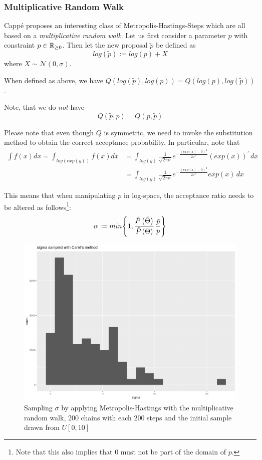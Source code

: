 \subsubsection{Multiplicative Random Walk}
Cappé \cite{cappe} proposes an interesting class of Metropolis-Hastings-Steps which are all based on a \textit{multiplicative random walk}. Let us first consider a parameter $p$ with constraint $p \in \mathbb{R}_{\geq 0}$. Then let the new proposal $\tilde{p}$ be defined as 
\[
	log\left(\tilde{p}\right) := log(p) + X
\]
where $X \sim \mathcal{N}(0, \sigma)$.

\begin{lemma}
	When defined as above, we have $Q\left(log(\tilde{p}), log(p)\right) = Q\left( log(p), log(\tilde{p})\right)$.
	
	Note, that we do \textit{not} have
	\[
	Q\left(\tilde{p}, p\right) = Q\left( p , \tilde{p}\right)
	\]
\end{lemma}

	 Please note that even though $Q$ is symmetric, we need to invoke the substitution method to obtain the correct acceptance probability. 
	 In particular, note that 
	 \begin{align*}
	 	\int f(x) dx = \int_{log(exp(y))} f(x) dx &= 
	 	\int_{log(y)} \frac{1}{\sqrt{2 \pi \sigma}} e^{- \frac{ \left(exp(x) - 0\right)^2}{2 \sigma^2}} \left(exp(x)\right)^{\prime}  \, dx\\
	 	&= \int_{log(y)} \frac{1}{\sqrt{2 \pi \sigma}} e^{- \frac{ \left(exp(x) - 0\right)^2}{2 \sigma^2}} exp(x) \, dx
	 \end{align*} 
	 
	 This means that when manipulating $p$ in log-space, the acceptance ratio needs to be altered as follows\footnote{Note that this also implies that $0$ must not be part of the domain of $p$. }:
	 \[
	 	\alpha := min \Bigg\{ 
	 		1, \frac{\tilde{P}\left(\tilde{\Theta}\right)}{\tilde{P}\left(\Theta\right)} \, \frac{\tilde{p}}{p}
	 		\Bigg\}
	 \]
	 
	 \begin{figure}
	 	\includegraphics[height=0.3\textheight]{img/carre_sigma_biased.png}
	 	\caption{Sampling $\sigma$ by applying Metropolis-Hastings with the multiplicative random walk, 200 chains with each 200 steps and the initial sample drawn from $U[0, 10]$}
	 	\label{fig:carre_sigma_not_uniform}
	 \end{figure}
	 
